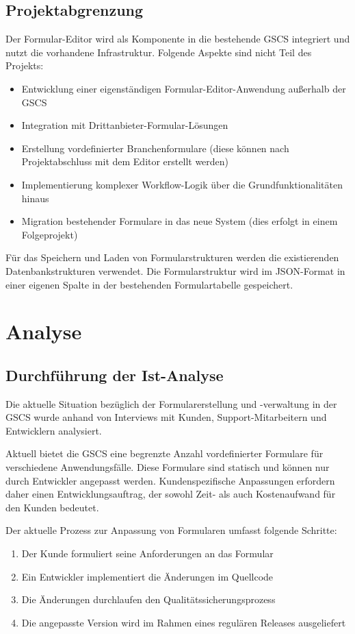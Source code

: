 \documentclass[a4paper,11pt]{article}
\begin{document}
\subsection{Projektabgrenzung}
Der Formular-Editor wird als Komponente in die bestehende GSCS integriert und nutzt die vorhandene Infrastruktur. Folgende Aspekte sind nicht Teil des Projekts:

\begin{itemize}
  \item Entwicklung einer eigenständigen Formular-Editor-Anwendung außerhalb der GSCS
  \item Integration mit Drittanbieter-Formular-Lösungen
  \item Erstellung vordefinierter Branchenformulare (diese können nach Projektabschluss mit dem Editor erstellt werden)
  \item Implementierung komplexer Workflow-Logik über die Grundfunktionalitäten hinaus
  \item Migration bestehender Formulare in das neue System (dies erfolgt in einem Folgeprojekt)
\end{itemize}

Für das Speichern und Laden von Formularstrukturen werden die existierenden Datenbankstrukturen verwendet. Die Formularstruktur wird im JSON-Format in einer eigenen Spalte in der bestehenden Formulartabelle gespeichert.

\section{Analyse}
\subsection{Durchführung der Ist-Analyse}
Die aktuelle Situation bezüglich der Formularerstellung und -verwaltung in der GSCS wurde anhand von Interviews mit Kunden, Support-Mitarbeitern und Entwicklern analysiert.

Aktuell bietet die GSCS eine begrenzte Anzahl vordefinierter Formulare für verschiedene Anwendungsfälle. Diese Formulare sind statisch und können nur durch Entwickler angepasst werden. Kundenspezifische Anpassungen erfordern daher einen Entwicklungsauftrag, der sowohl Zeit- als auch Kostenaufwand für den Kunden bedeutet.

Der aktuelle Prozess zur Anpassung von Formularen umfasst folgende Schritte:
\begin{enumerate}
  \item Der Kunde formuliert seine Anforderungen an das Formular
  \item Ein Entwickler implementiert die Änderungen im Quellcode
  \item Die Änderungen durchlaufen den Qualitätssicherungsprozess
  \item Die angepasste Version wird im Rahmen eines regulären Releases ausgeliefert
\end{enumerate}
\end{document}
